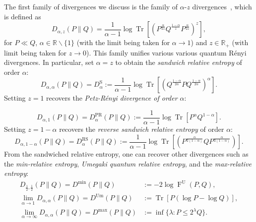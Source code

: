 \documentclass[12pt]{article}
\theoremstyle{definition}
\newcommand{\Fu}[2]{\operatorname{F}^\mathrm{U}\!\left(#1, #2\right)}
\begin{document}
The first family of divergences we discuss is the family of $\alpha$-$z$ divergences~\cite{audenaert2013alpha}, which is defined as
\begin{equation}
    D_{\alpha,z}(P\|Q) = \frac{1}{\alpha - 1} \log \operatorname{Tr}\left[ \left(P^\frac{\alpha}{2z} Q^\frac{1-\alpha}z P^\frac{\alpha}{2z} \right)^z \right],
\end{equation}
for $P \ll Q$, $\alpha \in \mathbb R \backslash \{1\}$ (with the limit being taken for $\alpha \to 1$) and $z \in \mathbb R_+$ (with limit being taken for $z \to 0$). This family unifies various various quantum R\'enyi divergences. In particular, set $\alpha = z$ to obtain the \textit{sandwich relative entropy} of order $\alpha$:
\begin{equation}
 D_{\alpha, \alpha} (P\|Q) =  D_\alpha^\text{S} :=  \frac{1}{\alpha-1} \log \operatorname{Tr}\left[ \left( Q^{\frac{1-\alpha}{2\alpha}} P Q^{\frac{1-\alpha}{2\alpha}} \right)^\alpha  \right].
\end{equation}
Setting $z=1$ recovers the \textit{Petz-R\'enyi divergence of order $\alpha$}:

\begin{equation}
  D_{\alpha,1} (P \| Q) = D^\text{PR}_\alpha (P\|Q) := \frac{1}{\alpha-1} \log \operatorname{Tr}[P^\alpha Q^{1-\alpha}]. 
\end{equation}
Setting $z = 1-\alpha$ recovers the \textit{reverse sandwich relative entropy} of order $\alpha$:
\begin{equation}
  D_{\alpha, 1-\alpha} (P \| Q) = D^\text{RS}_\alpha (P\|Q) := \frac{1}{\alpha-1} \log \operatorname{Tr}\left[ \left(P^{\frac\alpha{2(1-\alpha)}} Q P^{\frac\alpha{2(1-\alpha)}}\right)\right]. 
\end{equation}
From the sandwiched relative entropy, one can recover other divergences such as the \textit{min-relative entropy}, \textit{Umegaki quantum relative entropy}, and the \textit{max-relative entropy}:
\begin{equation}
\begin{aligned}
D_{\frac12, \frac12} (P\|Q) =  D^\text{min}(P\|Q) &:= - 2 \log \Fu{P}{Q}, \\ 
\lim_{\alpha \to 1} D_{\alpha, \alpha} (P\|Q) =  D^\text{Um}(P\|Q) &:= \operatorname{Tr}\left[P \left(\log P - \log Q \right)\right], \\ 
\lim_{\alpha \to \infty} D_{\alpha, \alpha} (P\|Q) =  D^\text{max}(P\|Q) &:= \inf\{\lambda : P \leq 2^\lambda Q\}. 
\end{aligned}
\end{equation}
\end{document}
